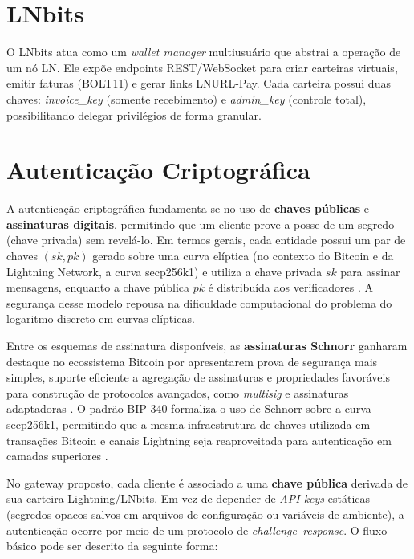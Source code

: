 \documentclass[openright]{normas-utf-tex}
\begin{document}
\section{LNbits}
O LNbits atua como um \textit{wallet manager} multiusuário que abstrai a operação de um nó LN. Ele expõe endpoints REST/WebSocket para criar carteiras virtuais, emitir faturas (BOLT11) e gerar links LNURL-Pay. Cada carteira possui duas chaves: \textit{invoice\_key} (somente recebimento) e \textit{admin\_key} (controle total), possibilitando delegar privilégios de forma granular.

\section{Autenticação Criptográfica}

A autenticação criptográfica fundamenta-se no uso de \textbf{chaves públicas} e \textbf{assinaturas digitais}, permitindo que um cliente prove a posse de um segredo (chave privada) sem revelá-lo. Em termos gerais, cada entidade possui um par de chaves $(sk, pk)$ gerado sobre uma curva elíptica (no contexto do Bitcoin e da Lightning Network, a curva secp256k1) e utiliza a chave privada $sk$ para assinar mensagens, enquanto a chave pública $pk$ é distribuída aos verificadores \cite{stallings2017cryptography}. A segurança desse modelo repousa na dificuldade computacional do problema do logaritmo discreto em curvas elípticas.

Entre os esquemas de assinatura disponíveis, as \textbf{assinaturas Schnorr} ganharam destaque no ecossistema Bitcoin por apresentarem prova de segurança mais simples, suporte eficiente a agregação de assinaturas e propriedades favoráveis para construção de protocolos avançados, como \textit{multisig} e assinaturas adaptadoras \cite{maxwell2018schnorr}. O padrão BIP-340 formaliza o uso de Schnorr sobre a curva secp256k1, permitindo que a mesma infraestrutura de chaves utilizada em transações Bitcoin e canais Lightning seja reaproveitada para autenticação em camadas superiores \cite{bip340}.

No gateway proposto, cada cliente é associado a uma \textbf{chave pública} derivada de sua carteira Lightning/LNbits. Em vez de depender de \textit{API keys} estáticas (segredos opacos salvos em arquivos de configuração ou variáveis de ambiente), a autenticação ocorre por meio de um protocolo de \textit{challenge--response}. O fluxo básico pode ser descrito da seguinte forma:
\end{document}
